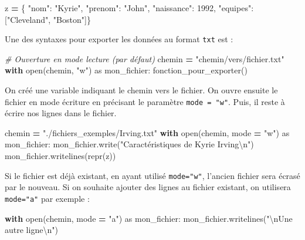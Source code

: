 \documentclass[12pt,]{book}
\newenvironment{Shaded}{\begin{snugshade}}{\end{snugshade}}
\newcommand{\DecValTok}[1]{\textcolor[rgb]{0.00,0.00,0.81}{#1}}
\newcommand{\CharTok}[1]{\textcolor[rgb]{0.31,0.60,0.02}{#1}}
\newcommand{\StringTok}[1]{\textcolor[rgb]{0.31,0.60,0.02}{#1}}
\newcommand{\ImportTok}[1]{#1}
\newcommand{\CommentTok}[1]{\textcolor[rgb]{0.56,0.35,0.01}{\textit{#1}}}
\newcommand{\ControlFlowTok}[1]{\textcolor[rgb]{0.13,0.29,0.53}{\textbf{#1}}}
\newcommand{\OperatorTok}[1]{\textcolor[rgb]{0.81,0.36,0.00}{\textbf{#1}}}
\newcommand{\BuiltInTok}[1]{#1}
\newcommand{\NormalTok}[1]{#1}
\numberwithin{equation}{section}
\numberwithin{countremarque}{section}
\begin{document}
\begin{Shaded}
\begin{Highlighting}[]
\NormalTok{z }\OperatorTok{=}\NormalTok{ \{ }\StringTok{"nom"}\NormalTok{: }\StringTok{"Kyrie"}\NormalTok{,}
  \StringTok{"prenom"}\NormalTok{: }\StringTok{"John"}\NormalTok{,}
  \StringTok{"naissance"}\NormalTok{: }\DecValTok{1992}\NormalTok{,}
  \StringTok{"equipes"}\NormalTok{: [}\StringTok{"Cleveland"}\NormalTok{, }\StringTok{"Boston"}\NormalTok{]\}}
\end{Highlighting}
\end{Shaded}

Une des syntaxes pour exporter les données au format \texttt{txt} est :

\begin{Shaded}
\begin{Highlighting}[]
\CommentTok{# Ouverture en mode lecture (par défaut)}
\NormalTok{chemin }\OperatorTok{=} \StringTok{"chemin/vers/fichier.txt"}
\ControlFlowTok{with} \BuiltInTok{open}\NormalTok{(chemin, }\StringTok{"w"}\NormalTok{) }\ImportTok{as}\NormalTok{ mon_fichier:}
\NormalTok{  fonction_pour_exporter()}
\end{Highlighting}
\end{Shaded}

On créé une variable indiquant le chemin vers le fichier. On ouvre
ensuite le fichier en mode écriture en précisant le paramètre
\texttt{mode\ =\ "w"}. Puis, il reste à écrire nos lignes dans le
fichier.

\begin{Shaded}
\begin{Highlighting}[]
\NormalTok{chemin }\OperatorTok{=} \StringTok{"./fichiers_exemples/Irving.txt"}
\ControlFlowTok{with} \BuiltInTok{open}\NormalTok{(chemin, mode }\OperatorTok{=} \StringTok{"w"}\NormalTok{) }\ImportTok{as}\NormalTok{ mon_fichier:}
\NormalTok{  mon_fichier.write(}\StringTok{"Caractéristiques de Kyrie Irving}\CharTok{\textbackslash{}n}\StringTok{"}\NormalTok{)}
\NormalTok{  mon_fichier.writelines(}\BuiltInTok{repr}\NormalTok{(z))}
\end{Highlighting}
\end{Shaded}

Si le fichier est déjà existant, en ayant utilisé \texttt{mode="w"},
l'ancien fichier sera écrasé par le nouveau. Si on souhaite ajouter des
lignes au fichier existant, on utilisera \texttt{mode="a"} par exemple :

\begin{Shaded}
\begin{Highlighting}[]
\ControlFlowTok{with} \BuiltInTok{open}\NormalTok{(chemin, mode }\OperatorTok{=} \StringTok{"a"}\NormalTok{) }\ImportTok{as}\NormalTok{ mon_fichier:}
\NormalTok{  mon_fichier.writelines(}\StringTok{"}\CharTok{\textbackslash{}n}\StringTok{Une autre ligne}\CharTok{\textbackslash{}n}\StringTok{"}\NormalTok{)}
\end{Highlighting}
\end{Shaded}
\end{document}
